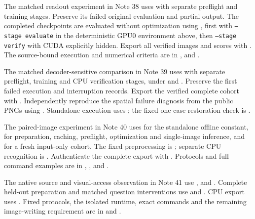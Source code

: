 \documentclass[10pt,a4paper]{article}
\begin{document}
The matched readout experiment in Note 38 uses
 with separate preflight and
training stages. Preserve its failed original evaluation and partial output.
The completed checkpoints are evaluated without optimization using
, first with
\texttt{--stage evaluate} in the deterministic GPU0 environment above, then
\texttt{--stage verify} with CUDA explicitly hidden. Export all verified
images and scores with .
The source-bound execution and numerical criteria are in
,
 and
.

The matched decoder-sensitive comparison in Note 39 uses
 with separate preflight, training
and CPU verification stages, under
 and
. Preserve the first failed
execution and interruption records. Export the verified complete cohort with
. Independently reproduce
the spatial failure diagnosis from the public PNGs using
. Standalone execution uses
; the fixed one-case restoration
check is .

The paired-image experiment in Note 40 uses
 for the standalone offline
constant,  for preparation,
caching, preflight, optimization and single-image inference, and
 for a fresh input-only cohort.
The fixed preprocessing is ;
separate CPU recognition is .
Authenticate the complete export with
. Protocols and full command
examples are in ,
,
 and
.

The native source and visual-access observation in Note 41 use
,
 and
. Complete held-out preparation
and matched question interventions use
 and
. CPU export uses
. Fixed protocols, the isolated
runtime, exact commands and the remaining image-writing requirement are in
 and
.
\end{document}
